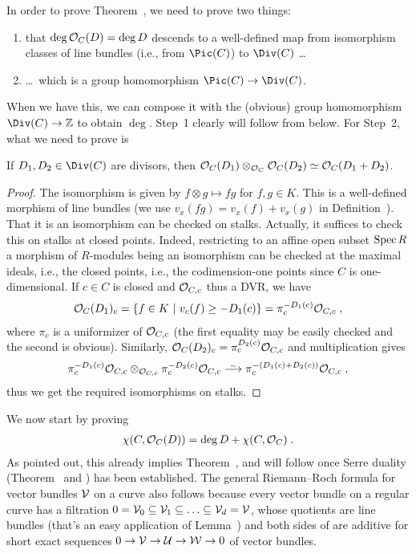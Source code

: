 \documentclass[a4paper,parskip=half,numbers=enddot, DIV=12]{scrreprt}
\begin{document}
In order to prove Theorem~, we need to prove two things: 
\begin{enumerate}
	\item that $\deg\mathcal{O}_C(D)=\deg D$ descends to a well-defined map from isomorphism classes of line bundles (i.e., from $\Pic(C)$) to $\Div(C)$ \ldots
	\item \ldots\ which is a group homomorphism $\Pic(C)\morphism\Div(C)$. 
\end{enumerate}
When we have this, we can compose it with the (obvious) group homomorphism $\Div(C)\morphism\IZ$ to obtain $\deg$. Step~1 clearly will follow from  below. For Step~2, what we need to prove is
\begin{fact}
	If $D_1,D_2\in\Div(C)$ are divisors, then $\mathcal{O}_C(D_1)\otimes_{\mathcal{O}_C}\mathcal{O}_C(D_2)\simeq\mathcal{O}_C(D_1+D_2)$.
\end{fact}
\begin{proof}
	The isomorphism is given by $f\otimes g\mapsto fg$ for $f,g\in K$. This is a well-defined morphism of line bundles (we use $v_x(fg)=v_x(f)+v_x(g)$ in Definition~). That it is an isomorphism can be checked on stalks. Actually, it suffices to check this on stalks at closed points. Indeed, restricting to an affine open subset $\operatorname{Spec} R$ a morphism of $R$-modules being an isomorphism can be checked at the maximal ideals, i.e., the closed points, i.e., the codimension-one points since $C$ is one-dimensional. If $c\in C$ is closed and $\mathcal{O}_{C,c}$ thus a DVR, we have 
	\begin{align*}
		\mathcal{O}_C(D_1)_c=\left\{f\in K\ \middle|\  v_c(f)\geq -D_1(c)\right\}=\pi_c^{-D_1(c)}\mathcal{O}_{C,c}\;,
	\end{align*}
	where $\pi_c$ is a uniformizer of $\mathcal{O}_{C,c}$ (the first equality may be easily checked and the second is obvious). Similarly, $\mathcal{O}_C(D_2)_c=\pi_c^{D_2(c)}\mathcal{O}_{C,c}$ and multiplication gives
	\begin{align*}
		\pi_c^{-D_1(c)}\Oo_{C,c}\otimes_{\Oo_{C,c}}\pi_c^{-D_2(c)}\Oo_{C,c}\isomorphism \pi_c^{-(D_1(c)+D_2(c))}\Oo_{C,c}\;,
	\end{align*}
	thus we get the required isomorphisms on stalks.
\end{proof}

We now start by proving
	\begin{align}\lbl{eq:RiemannRoch4}
		\chi(C,\Oo_C(D))=\deg D+\chi(C,\Oo_C)\;.
	\end{align}
As pointed out, this already implies Theorem~, and  will follow once Serre duality (Theorem~ and ) has been established. The general Riemann--Roch formula for vector bundles $\mathcal{V}$ on a curve also follows because every vector bundle on a regular curve has a filtration $0=\mathcal{V}_0\subseteq \mathcal{V}_1\subseteq\ldots\subseteq \mathcal{V}_d=\mathcal{V}$, whose quotients are line bundles (that's an easy application of Lemma~) and both sides of  are additive for short exact sequences $0\morphism\Vv\morphism\Uu\morphism\Ww\morphism 0$ of vector bundles.
\end{document}
